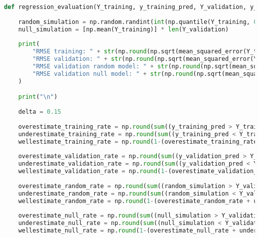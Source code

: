 \begin{lstlisting}[language=Python]
def regression_evaluation(Y_training, y_training_pred, Y_validation, y_validation_pred):
    
    random_simulation = np.random.randint(int(np.quantile(Y_training, 0)*10), int(np.quantile(Y_training, 1)*10), size=len(Y_validation)) * 0.1
    null_simulation = [np.mean(Y_training)] * len(Y_validation)
    
    print(
        "RMSE training: " + str(np.round(np.sqrt(mean_squared_error(Y_training, y_training_pred)), 4)) + "\n" +
        "RMSE validation: " + str(np.round(np.sqrt(mean_squared_error(Y_validation, y_validation_pred)), 4)) + "\n" + 
        "RMSE validation random model: " + str(np.round(np.sqrt(mean_squared_error(Y_validation, random_simulation)), 4)) + "\n" +
        "RMSE validation null model: " + str(np.round(np.sqrt(mean_squared_error(Y_validation, null_simulation)), 4))
    )

    print("\n")
    
    delta = 0.15
    
    overestimate_training_rate = np.round(sum((y_training_pred > Y_training * (1 + delta)) == True)/len(Y_training), 4)
    underestimate_training_rate = np.round(sum((y_training_pred < Y_training * (1 - delta)) == True)/len(Y_training), 4)
    wellestimate_training_rate = np.round(1-(overestimate_training_rate + underestimate_training_rate), 4)
    
    overestimate_validation_rate = np.round(sum((y_validation_pred > Y_validation * (1 + delta)) == True)/len(Y_validation), 4)
    underestimate_validation_rate = np.round(sum((y_validation_pred < Y_validation * (1 - delta)) == True)/len(Y_validation), 4)
    wellestimate_validation_rate = np.round(1-(overestimate_validation_rate + underestimate_validation_rate), 4)
    
    overestimate_random_rate = np.round(sum((random_simulation > Y_validation * (1 + delta)) == True)/len(Y_validation), 4)
    underestimate_random_rate = np.round(sum((random_simulation < Y_validation * (1 - delta)) == True)/len(Y_validation), 4)
    wellestimate_random_rate = np.round(1-(overestimate_random_rate + underestimate_random_rate), 4)
    
    overestimate_null_rate = np.round(sum((null_simulation > Y_validation * (1 + delta)) == True)/len(Y_validation), 4)
    underestimate_null_rate = np.round(sum((null_simulation < Y_validation * (1 - delta)) == True)/len(Y_validation), 4)
    wellestimate_null_rate = np.round(1-(overestimate_null_rate + underestimate_null_rate), 4)
    

\end{lstlisting}
